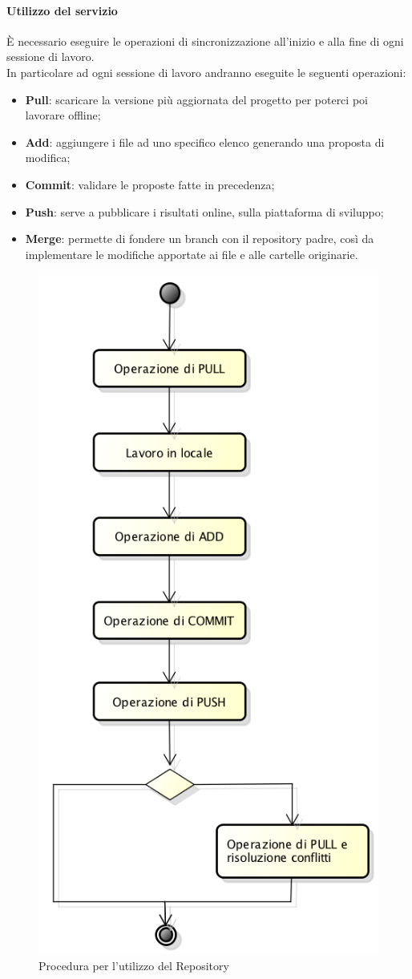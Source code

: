 \paragraph{Utilizzo del servizio}
È necessario eseguire le operazioni di sincronizzazione all'inizio e alla fine di ogni sessione di lavoro. \\
In particolare ad ogni sessione di lavoro andranno eseguite le seguenti operazioni:
\begin{itemize}
	\item \textbf{Pull}: scaricare la versione più aggiornata del progetto per poterci poi lavorare offline;
	\item \textbf{Add}: aggiungere i file ad uno specifico elenco generando una proposta di modifica;
	\item \textbf{Commit}: validare le proposte fatte in precedenza;
	\item \textbf{Push}: serve a pubblicare i risultati online, sulla piattaforma di sviluppo;
	\item \textbf{Merge}: permette di fondere un \gls{branch} con il \gls{repository} padre, così da implementare le modifiche apportate ai file e alle cartelle originarie.
\end{itemize}
\begin{figure}[h]
\centering
\includegraphics[width=0.5\linewidth]{img/proceduraRepository}
\caption[Procedura per l'utilizzo del Repository]{Procedura per l'utilizzo del Repository}
\label{fig:proceduraRepository}
\end{figure}

